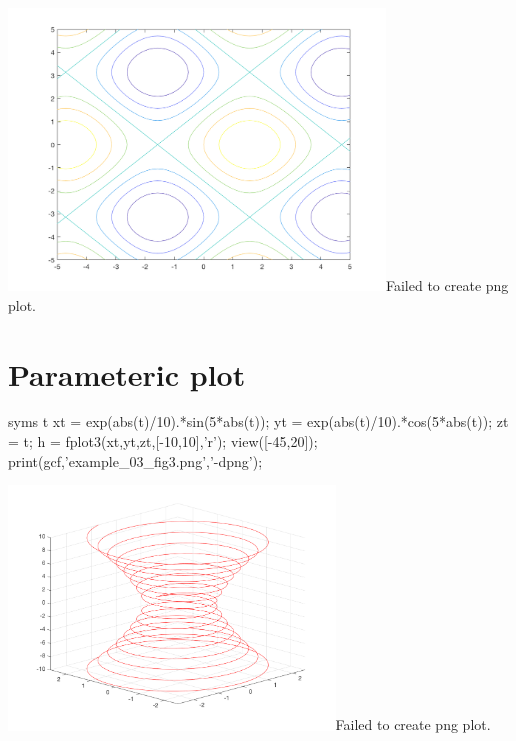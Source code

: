 \documentclass[12pt]{matlatex}
\begin{document}
\begin{minipage}{\textwidth}
   \centering
   {\includegraphics[width=0.75\textwidth]{example_03_fig2.png}}{Failed to create png plot.}
\end{minipage}

\section*{Parameteric plot}

\begin{matlab}
   syms t
   xt = exp(abs(t)/10).*sin(5*abs(t));
   yt = exp(abs(t)/10).*cos(5*abs(t));
   zt = t;
   h = fplot3(xt,yt,zt,[-10,10],'r');
   view([-45,20]);
   print(gcf,'example_03_fig3.png','-dpng');
\end{matlab}

\begin{minipage}{\textwidth}
   \centering
   {\includegraphics[width=0.65\textwidth]{example_03_fig3.png}}{Failed to create png plot.}
\end{minipage}
\end{document}
